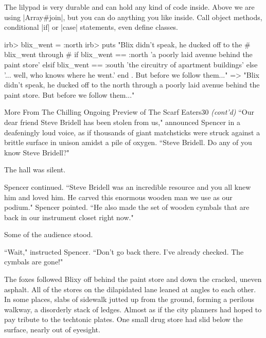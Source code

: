 \documentclass[12pt,twoside]{report}
\begin{document}
The lilypad is very durable and can hold any kind of code inside.
Above we are using \rubyinline|Array#join|, but you
can do anything you like inside.  Call object methods, conditional
\rubyinline|if| or \rubyinline|case|
statements, even define classes.


\begin{consolecode}

 irb> blix_went = :north
 irb> puts "Blix didn't speak, he ducked off to the #{ blix_went } through #{
             if blix_went == :north
               'a poorly laid avenue behind the paint store'
             elsif blix_went == :south
               'the circuitry of apartment buildings'
             else
               '... well, who knows where he went.'
             end }.  But before we follow them..."
 => "Blix didn't speak, he ducked off to the north through a poorly laid avenue
     behind the paint store.  But before we follow them..."

\end{consolecode}

	\begin{sidebar}{More From The Chilling Ongoing Preview of The Scarf Eaters}{30}
		\textit{(cont'd)} ``Our dear friend Steve Bridell has been stolen from us," announced Spencer in a deafeningly loud voice, as if thousands of giant matchsticks were struck against a brittle surface in unison amidst a pile of oxygen. ``Steve Bridell. Do any of you know Steve Bridell?"\vspace{6pt}
		
		The hall was silent.\vspace{6pt}

		Spencer continued. ``Steve Bridell was an incredible resource and you all knew him and loved him. He carved this enormous wooden man we use as our podium." Spencer pointed. ``He also made the set of wooden cymbals that are back in our instrument closet right now."\vspace{6pt}

		Some of the audience stood.\vspace{6pt}

		``Wait," instructed Spencer. ``Don't go back there. I've already checked. The cymbals are gone!"
	\end{sidebar}

The foxes followed Blixy off behind the paint store and down the
cracked, uneven asphalt. All of the stores on the dilapidated lane
leaned at angles to each other.  In some places, slabs of sidewalk
jutted up from the ground, forming a perilous walkway, a disorderly
stack of ledges.  Almost as if the city planners had hoped to pay
tribute to the techtonic plates.  One small drug store had slid below
the surface, nearly out of eyesight.
\end{document}
